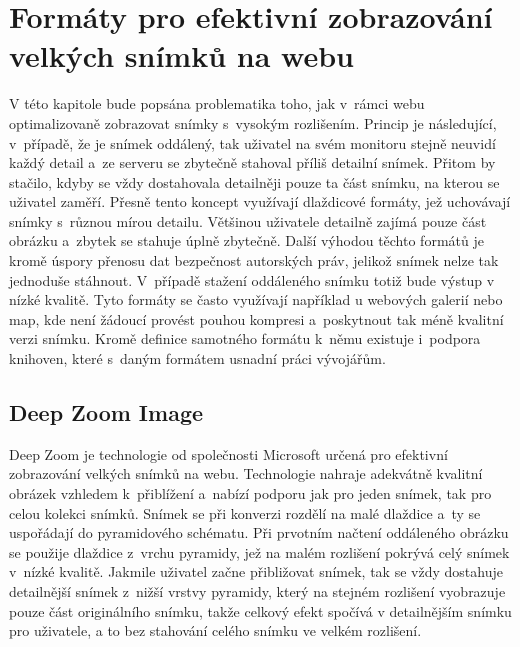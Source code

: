 \chapter{Formáty pro efektivní zobrazování velkých snímků na webu}
\label{chap:formats}
V této kapitole bude popsána problematika toho, jak v~rámci webu optimalizovaně zobrazovat snímky s~vysokým rozlišením. Princip je následující, v~případě, že je snímek oddálený, tak uživatel na svém monitoru stejně neuvidí každý detail a~ze serveru se zbytečně stahoval příliš detailní snímek. Přitom by stačilo, kdyby se vždy dostahovala detailněji pouze ta část snímku, na kterou se uživatel zaměří. Přesně tento koncept využívají dlaždicové formáty, jež uchovávají snímky s~různou mírou detailu. Většinou uživatele detailně zajímá pouze část obrázku a~zbytek se stahuje úplně zbytečně. Další výhodou těchto formátů je kromě úspory přenosu dat bezpečnost autorských práv, jelikož snímek nelze tak jednoduše stáhnout. V~případě stažení oddáleného snímku totiž bude výstup v nízké kvalitě. Tyto formáty se často využívají například u webových galerií nebo map, kde není žádoucí provést pouhou kompresi a~poskytnout tak méně kvalitní verzi snímku. Kromě definice samotného formátu k~němu existuje i~podpora knihoven, které s~daným formátem usnadní práci vývojářům.

\section{Deep Zoom Image}
Deep Zoom \cite{MicrosoftDeepZoom} je technologie od společnosti Microsoft určená pro efektivní zobrazování velkých snímků na webu. Technologie nahraje adekvátně kvalitní obrázek vzhledem k~přiblížení a~nabízí podporu jak pro jeden snímek, tak pro celou kolekci snímků. Snímek se při konverzi rozdělí na malé dlaždice a~ty se uspořádají do pyramidového schématu. Při prvotním načtení oddáleného obrázku se použije dlaždice z~vrchu pyramidy, jež na malém rozlišení pokrývá celý snímek v~nízké kvalitě. Jakmile uživatel začne přibližovat snímek, tak se vždy dostahuje detailnější snímek z~nižší vrstvy pyramidy, který na stejném rozlišení vyobrazuje pouze část originálního snímku, takže celkový efekt spočívá v detailnějším snímku pro uživatele, a to bez stahování celého snímku ve velkém rozlišení. 

